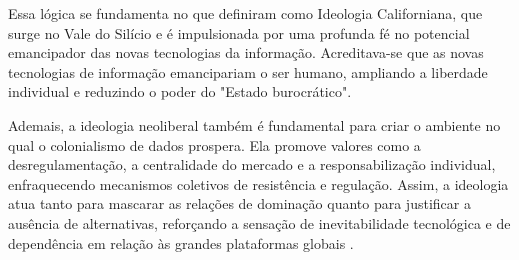 Essa lógica se fundamenta no que  definiram como Ideologia Californiana, que surge no Vale do Silício e é impulsionada por uma profunda fé no potencial emancipador das novas tecnologias da informação. Acreditava-se que as novas tecnologias de informação emancipariam o ser humano, ampliando a liberdade individual e reduzindo o poder do "Estado burocrático".

Ademais, a ideologia neoliberal também é fundamental para criar o ambiente no qual o colonialismo de dados prospera. Ela promove valores como a desregulamentação, a centralidade do mercado e a responsabilização individual, enfraquecendo mecanismos coletivos de resistência e regulação. Assim, a ideologia atua tanto para mascarar as relações de dominação quanto para justificar a ausência de alternativas, reforçando a sensação de inevitabilidade tecnológica e de dependência em relação às grandes plataformas globais \cite{Faustino2023}.




